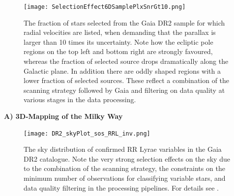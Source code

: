 \begin{figure}
    \centering
    \texttt{[image: SelectionEffect6DSamplePlxSnrGt10.png]}
    \caption{The fraction of stars selected from the Gaia DR2 sample for which radial velocities are listed, when demanding that the parallax is larger than 10 times its uncertainty. Note how the ecliptic pole regions on the top left and bottom right are strongly favoured, whereas the fraction of selected source drops dramatically along the Galactic plane. In addition there are oddly shaped regions with a lower fraction of selected sources. These reflect a combination of the scanning strategy followed by Gaia and filtering on data quality at various stages in the data processing.}
    \label{fig:6dplxsnrgt10}
\end{figure}
\noindent\textbf{A) 3D-Mapping of the Milky Way}

\begin{figure}
    \centering
    \texttt{[image: DR2\_skyPlot\_sos\_RRL\_inv.png]}
    \caption{The sky distribution of confirmed RR Lyrae variables in the Gaia DR2 catalogue. Note the very strong selection effects on the sky due to the combination of the scanning strategy, the constraints on the minimum number of observations for classifying variable stars, and data quality filtering in the processing pipelines. For details see \cite{2018A&A...618A..30H}.}
    \label{fig:rrl}
\end{figure}

